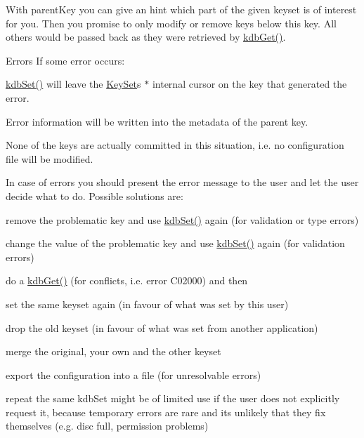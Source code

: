 With {\ttfamily parent\+Key} you can give an hint which part of the given keyset is of interest for you. Then you promise to only modify or remove keys below this key. All others would be passed back as they were retrieved by \hyperlink{group__kdb_ga28e385fd9cb7ccfe0b2f1ed2f62453a1}{kdb\+Get()}.

\begin{DoxyParagraph}{Errors}
If some error occurs\+:
\begin{DoxyItemize}
\item \hyperlink{group__kdb_ga11436b058408f83d303ca5e996832bcf}{kdb\+Set()} will leave the \hyperlink{classkdb_1_1KeySet}{Key\+Set}\textquotesingle{}s $\ast$ internal cursor on the key that generated the error.
\item Error information will be written into the metadata of the parent key.
\item None of the keys are actually committed in this situation, i.\+e. no configuration file will be modified.
\end{DoxyItemize}
\end{DoxyParagraph}
In case of errors you should present the error message to the user and let the user decide what to do. Possible solutions are\+:
\begin{DoxyItemize}
\item remove the problematic key and use \hyperlink{group__kdb_ga11436b058408f83d303ca5e996832bcf}{kdb\+Set()} again (for validation or type errors)
\item change the value of the problematic key and use \hyperlink{group__kdb_ga11436b058408f83d303ca5e996832bcf}{kdb\+Set()} again (for validation errors)
\item do a \hyperlink{group__kdb_ga28e385fd9cb7ccfe0b2f1ed2f62453a1}{kdb\+Get()} (for conflicts, i.\+e. error C02000) and then
\begin{DoxyItemize}
\item set the same keyset again (in favour of what was set by this user)
\item drop the old keyset (in favour of what was set from another application)
\item merge the original, your own and the other keyset
\end{DoxyItemize}
\item export the configuration into a file (for unresolvable errors)
\item repeat the same kdb\+Set might be of limited use if the user does not explicitly request it, because temporary errors are rare and its unlikely that they fix themselves (e.\+g. disc full, permission problems)
\end{DoxyItemize}

